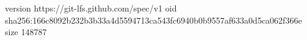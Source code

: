 version https://git-lfs.github.com/spec/v1
oid sha256:166c8092b232b3b33a4d5594713ca543fc6940b0b9557af633a0d5ca062f366e
size 148787
